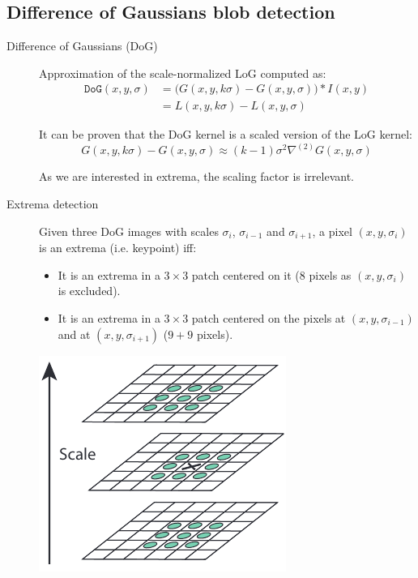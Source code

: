 \subsection{Difference of Gaussians blob detection}

\begin{description}
    \item[Difference of Gaussians (DoG)] 
        Approximation of the scale-normalized LoG computed as:
        \[ 
            \begin{split}
                \texttt{DoG}(x, y, \sigma) &= \big( G(x, y, k\sigma) - G(x, y, \sigma) \big) * I(x, y) \\
                    &= L(x, y, k\sigma) - L(x, y, \sigma) 
            \end{split}
        \]

        \begin{theorem}
            It can be proven that the DoG kernel is a scaled version of the LoG kernel:
            \[ G(x, y, k\sigma) - G(x, y, \sigma) \approx (k-1)\sigma^2 \nabla^{(2)}G(x, y, \sigma) \]

            \begin{remark}
                As we are interested in extrema, the scaling factor is irrelevant.
            \end{remark}
        \end{theorem}

    \item[Extrema detection] 
        Given three DoG images with scales $\sigma_i$, $\sigma_{i-1}$ and $\sigma_{i+1}$,
        a pixel $(x, y, \sigma_i)$ is an extrema (i.e. keypoint) iff:
        \begin{itemize}
            \item It is an extrema in a $3 \times 3$ patch centered on it (8 pixels as $(x, y, \sigma_i)$ is excluded).
            \item It is an extrema in a $3 \times 3$ patch centered on the pixels at $(x, y, \sigma_{i-1})$ and at $(x, y, \sigma_{i+1})$ ($9+9$ pixels).
        \end{itemize}

        \begin{center}
            \includegraphics[width=0.35\linewidth]{./img/_DoG_extrema.pdf}
        \end{center}


\end{description}
